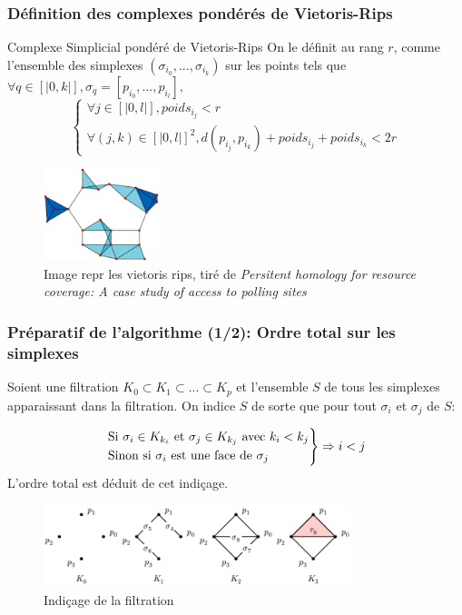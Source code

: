 \documentclass{beamer}
\begin{document}
\begin{frame}
    \frametitle{Définition des complexes pondérés de Vietoris-Rips}
    \begin{block}{Complexe Simplicial pondéré de Vietoris-Rips}
        On le définit au rang $r$, comme l'ensemble des simplexes $(\sigma_{i_0}, ..., \sigma_{i_k})$ sur les points tels que $\forall q \in [|0, k|], \sigma_q = [p_{i_0}, ...,p_{i_l}],$ 
        $$
            \begin{cases}
                \forall j \in [|0, l|], poids_{i_j} < r\\
                \forall (j,k) \in [|0, l|]^2, d(p_{i_j}, p_{i_k}) + poids_{i_j} + poids_{i_k} < 2r
            \end{cases}
        $$
    \end{block}

    \begin{figure}
        \centering
        \includegraphics[width=0.3\textwidth]{../images/VR_complex.png}
        \caption{Image repr les vietoris rips, tiré de \textit{Persitent homology for resource coverage: A case study of access to polling sites}}
    \end{figure}
    
\end{frame}

\begin{frame}
    \frametitle{Préparatif de l'algorithme (1/2): Ordre total sur les simplexes}
    Soient une filtration $K_0 \subset K_1 \subset ... \subset K_p$ et l'ensemble $S$ de tous les simplexes apparaissant dans la filtration. On indice $S$ de sorte que pour tout $\sigma_i$ et $\sigma_j$ de $S$: 

    $$ 
    \begin{rcases}
        \text{Si } \sigma_i \in K_{k_i} \text{ et } \sigma_j \in K_{k_j} \text{ avec } k_i < k_j\\
        \text{Sinon si } \sigma_i \text{ est une face de } \sigma_j
    \end{rcases}\Rightarrow i < j 
    $$
    L'ordre total est déduit de cet indiçage.
    \begin{figure}
        \centering
        \includegraphics[width=0.8\textwidth]{../images/filtration_horizontal.png}
        \caption{Indiçage de la filtration}
    \end{figure}
\end{frame}
\end{document}
